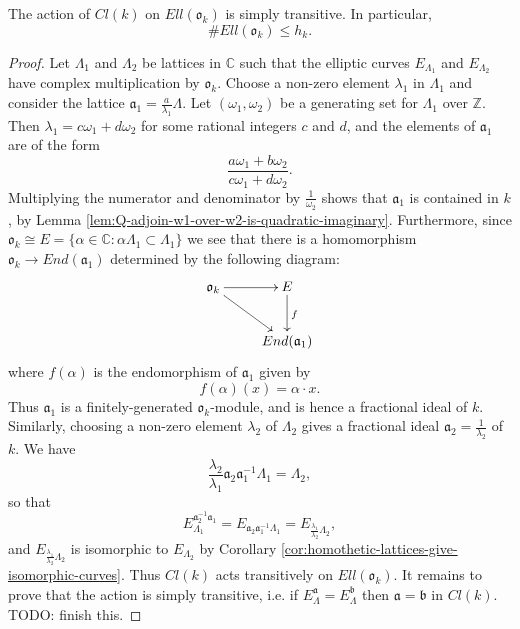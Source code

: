 \begin{thm}
  \label{thm:class-group-action-is-simply-transitive}
  The action of $Cl(k)$ on $Ell(\mathfrak{o}_{k})$ is simply transitive.  In
  particular,
  \begin{equation*}
    \# Ell(\mathfrak{o}_{k}) \leq h_{k}.
  \end{equation*}
\end{thm}
\begin{proof}
  Let $\Lambda_{1}$ and $\Lambda_{2}$ be lattices in $\mathbb{C}$ such that the
  elliptic curves $E_{\Lambda_{1}}$ and $E_{\Lambda_{2}}$ have complex multiplication
  by $\mathfrak{o}_{k}$.  Choose a non-zero element $\lambda_{1}$ in $\Lambda_{1}$
  and consider the lattice $\mathfrak{a}_{1} = \frac{a}{\lambda_{1}}\Lambda$.  Let
  $(\omega_{1},\omega_{2})$ be a generating set for $\Lambda_{1}$ over $\mathbb{Z}$.
  Then $\lambda_{1} = c\omega_{1} + d\omega_{2}$ for some rational integers $c$ and
  $d$, and the elements of $\mathfrak{a}_{1}$ are of the form
  \begin{equation*}
    \frac{a\omega_{1} + b\omega_{2}}{c\omega_{1} + d\omega_{2}}.
  \end{equation*}
  Multiplying the numerator and denominator by $\frac{1}{\omega_{2}}$ shows that
  $\mathfrak{a}_{1}$ is contained in $k$, by Lemma
  \ref{lem:Q-adjoin-w1-over-w2-is-quadratic-imaginary}.  Furthermore, since
  $\mathfrak{o}_{k} \cong E = \{\alpha \in \mathbb{C} : \alpha \Lambda_{1} \subset
  \Lambda_{1} \}$ we see that there is a homomorphism $\mathfrak{o}_{k} \rightarrow
  End(\mathfrak{a}_{1})$ determined by the following diagram:
  \begin{equation*}
  \xymatrix{
    \mathfrak{o}_{k} \ar[rd] \ar[r] & E \ar[d]^{f}\\
    &End(\mathfrak{a}_{1})
  }
\end{equation*}
where $f(\alpha)$ is the endomorphism of $\mathfrak{a}_{1}$ given by
\begin{equation*}
  f(\alpha)(x) = \alpha \cdot x.
\end{equation*}
Thus $\mathfrak{a}_{1}$ is a finitely-generated $\mathfrak{o}_{k}$-module, and is
hence a fractional ideal of $k$.  Similarly, choosing a non-zero element
$\lambda_{2}$ of $\Lambda_{2}$ gives a fractional ideal $\mathfrak{a}_{2} =
\frac{1}{\lambda_{2}}$ of $k$.  We have
\begin{equation*}
  \frac{\lambda_{2}}{\lambda_{1}}\mathfrak{a}_{2}\mathfrak{a}_{1}^{-1}\Lambda_{1} = \Lambda_{2},
\end{equation*}
so that
\begin{equation*}
  E_{\Lambda_{1}}^{\mathfrak{a}_{2}^{-1}\mathfrak{a}_{1}} =
  E_{\mathfrak{a}_{2}\mathfrak{a}_{1}^{-1}\Lambda_{1}} = E_{\frac{\lambda_{1}}{\lambda_{2}}\Lambda_{2}},
\end{equation*}
and $E_{\frac{\lambda_{1}}{\lambda_{2}}\Lambda_{2}}$ is isomorphic to
$E_{\Lambda_{2}}$ by Corollary \ref{cor:homothetic-lattices-give-isomorphic-curves}.
Thus $Cl(k)$ acts transitively on $Ell(\mathfrak{o}_{k})$.  It remains to prove that
the action is simply transitive, i.e. if $E_{\Lambda}^{\mathfrak{a}} =
E_{\Lambda}^{\mathfrak{b}}$ then $\mathfrak{a} = \mathfrak{b}$ in $Cl(k)$.  TODO:
finish this.
\end{proof}

